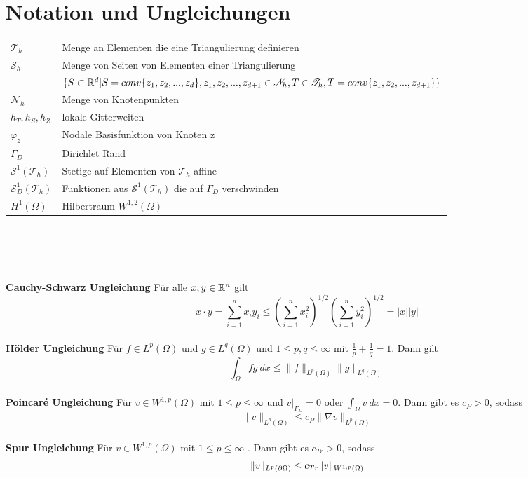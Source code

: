 \appendix
\chapter{Notation und Ungleichungen}
\begin{tabular}{l l}
	$\mathscr{T}_h$&Menge an Elementen die eine Triangulierung definieren\\
	$\mathscr{S}_h$&Menge von Seiten von Elementen einer Triangulierung\\
	& $\{S\subset\mathbb{R}^d|S= conv\{z_1,z_2,...,z_d\},z_1,z_2,...,z_{d+1}\in\mathscr{N}_h, T\in\mathscr{T}_h, T= conv\{z_1,z_2,...,z_{d+1}\}\}$\\
	$\mathscr{N}_h$&Menge von Knotenpunkten\\
	$h_T,h_S,h_Z$&lokale Gitterweiten\\
	$\varphi_z$&Nodale Basisfunktion von Knoten z\\
	$\Gamma_D$&Dirichlet Rand\\
	$\mathscr{S}^1(\mathscr{T}_h)$&Stetige auf Elementen von $\mathscr{T}_h$ affine\\
	$\mathscr{S}^1_D(\mathscr{T}_h)$&Funktionen aus $\mathscr{S}^1(\mathscr{T}_h)$ die auf $\Gamma_D$ verschwinden\\
	$H^1(\Omega)$ &Hilbertraum $W^{1,2}(\Omega)$\\
\end{tabular}
\\  \\ \\ \\
\textbf{Cauchy-Schwarz Ungleichung}
Für alle $x,y\in\mathbb{R}^n$ gilt
\[
x\cdot y =\sum_{i=1}^{n} x_iy_i\leq\left(\sum_{i=1}^{n}x_i^2\right)^{1/2}\left(\sum_{i=1}^{n}y_i^2\right)^{1/2} =|x||y|
\]\\
\textbf{Hölder Ungleichung}
Für $f\in L^p(\Omega)$ und $g\in L^q(\Omega)$ und $1\leq p, q\leq \infty$ mit $\frac{1}{p}+\frac{1}{q}=1$. Dann gilt
\[
\int_{\Omega} fg\:dx\leq \|f\|_{L^p(\Omega)} \|g\|_{L^q(\Omega)}
\]\\
\textbf{Poincaré Ungleichung}
Für $v\in W^{1,p}(\Omega)$ mit $1\leq p \leq \infty$ und $v|_{\Gamma_D}=0$ oder $\int_{\Omega}v\:dx =0$. Dann gibt es $c_P>0$, sodass
\[
\|v\|_{L^p(\Omega)} \leq c_P\|\nabla v\|_{L^p(\Omega)}
\]\\

\textbf{Spur Ungleichung}
Für $v\in W^{1,p}(\Omega)$ mit $1\leq p \leq \infty$ . Dann gibt es $c_{Tr}>0$, sodass
\[
\|v\|_{L^p(\partial \Omega)} \leq c_{Tr}\|v\|_{W^{1,p}(\Omega)}
\]